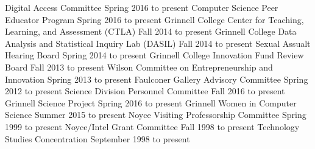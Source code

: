 \begin{cventries}


  {Digital Access Committee}
  {Spring 2016 to present}
  {Computer Science Peer Educator Program}
  {Spring 2016 to present}
  {Grinnell College Center for Teaching, Learning, and Assessment (CTLA)}
  {Fall 2014 to present}
  {Grinnell College Data Analysis and Statistical Inquiry Lab (DASIL)}
  {Fall 2014 to present}
  {Sexual Assualt Hearing Board}
  {Spring 2014 to present}
  {Grinnell College Innovation Fund Review Board}
  {Fall 2013 to present}
  {Wilson Committee on Entrepreneurship and Innovation}
  {Spring 2013 to present}
  {Faulconer Gallery Advisory Committee}
  {Spring 2012 to present}
  {Science Division Personnel Committee}
  {Fall 2016 to present}
  {Grinnell Science Project}
  {Spring 2016 to present}
  {Grinnell Women in Computer Science}
  {Summer 2015 to present}
  {Noyce Visiting Professorship Committee}
  {Spring 1999 to present}
  {Noyce/Intel Grant Committee}
  {Fall 1998 to present}
  {Technology Studies Concentration}
  {September 1998 to present}

\vspace{1mm}



\end{cventries}
